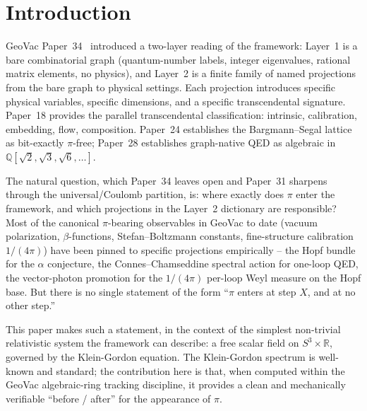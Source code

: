\documentclass[11pt]{article}
\begin{document}
\begin{abstract}
This paper introduces no new computation beyond the verification sprint
$\mathrm{KG}\text{-}1$, $\mathrm{KG}\text{-}2$, $\mathrm{KG}\text{-}3$.
Its contribution is the structural observation that \emph{time, not
mass}, is the projection axis along which $\pi$ enters the framework,
and that the observer's finite-time measurement window is the formal
mechanism.
\end{abstract}

\section{Introduction}
\label{sec:intro}

GeoVac Paper~34~\cite{paper34} introduced a two-layer reading of the
framework: Layer~1 is a bare combinatorial graph (quantum-number labels,
integer eigenvalues, rational matrix elements, no physics), and Layer~2
is a finite family of named projections from the bare graph to physical
settings.  Each projection introduces specific physical variables,
specific dimensions, and a specific transcendental signature.  Paper~18
\cite{paper18} provides the parallel transcendental classification:
intrinsic, calibration, embedding, flow, composition.  Paper~24
\cite{paper24} establishes the Bargmann--Segal lattice as bit-exactly
$\pi$-free; Paper~28 \cite{paper28} establishes graph-native QED as
algebraic in $\mathbb{Q}[\sqrt{2}, \sqrt{3}, \sqrt{6}, \ldots]$.

The natural question, which Paper~34 leaves open and Paper~31
\cite{paper31} sharpens through the universal/Coulomb partition, is:
where exactly does $\pi$ enter the framework, and which projections in
the Layer~2 dictionary are responsible?  Most of the canonical
$\pi$-bearing observables in GeoVac to date (vacuum polarization,
$\beta$-functions, Stefan--Boltzmann constants, fine-structure
calibration $1/(4\pi)$) have been pinned to specific projections
empirically -- the Hopf bundle for the $\alpha$ conjecture, the
Connes--Chamseddine spectral action for one-loop QED, the vector-photon
promotion for the $1/(4\pi)$ per-loop Weyl measure on the Hopf base.
But there is no single statement of the form ``$\pi$ enters at step $X$,
and at no other step.''

This paper makes such a statement, in the context of the simplest
non-trivial relativistic system the framework can describe: a free
scalar field on $S^3 \times \mathbb{R}$, governed by the Klein-Gordon
equation.  The Klein-Gordon spectrum is well-known and standard; the
contribution here is that, when computed within the GeoVac
algebraic-ring tracking discipline, it provides a clean and
mechanically verifiable ``before / after'' for the appearance of $\pi$.
\end{document}
